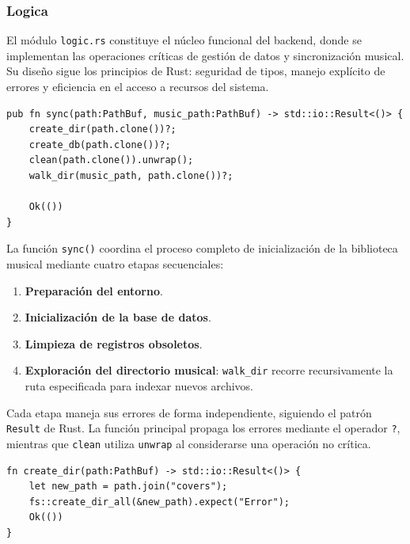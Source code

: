 \documentclass[11pt, a4paper]{article}
\begin{document}
            \subsubsection{Logica}

            El módulo \verb|logic.rs| constituye el núcleo funcional del backend, donde se implementan las operaciones críticas de gestión de datos y sincronización musical. Su diseño sigue los principios de Rust: seguridad de tipos, manejo explícito de errores y eficiencia en el acceso a recursos del sistema.

            \begin{lstlisting}[caption={fn sync()}]
pub fn sync(path:PathBuf, music_path:PathBuf) -> std::io::Result<()> {
    create_dir(path.clone())?;
    create_db(path.clone())?;
    clean(path.clone()).unwrap();
    walk_dir(music_path, path.clone())?;

    Ok(())
}
            \end{lstlisting}

            La función \verb|sync()| coordina el proceso completo de inicialización de la biblioteca musical mediante cuatro etapas secuenciales:

            \begin{enumerate}
                \item \textbf{Preparación del entorno}.
                \item \textbf{Inicialización de la base de datos}.
                \item \textbf{Limpieza de registros obsoletos}.
                \item \textbf{Exploración del directorio musical}: \verb|walk_dir| recorre recursivamente la ruta especificada para indexar nuevos archivos.
            \end{enumerate}

            Cada etapa maneja sus errores de forma independiente, siguiendo el patrón \verb|Result| de Rust. La función principal propaga los errores mediante el operador \verb|?|, mientras que \verb|clean| utiliza \verb|unwrap| al considerarse una operación no crítica.

            \begin{lstlisting}[caption={fn create\_dir()}]
fn create_dir(path:PathBuf) -> std::io::Result<()> {
    let new_path = path.join("covers");
    fs::create_dir_all(&new_path).expect("Error");
    Ok(())
}
            \end{lstlisting}
\end{document}
